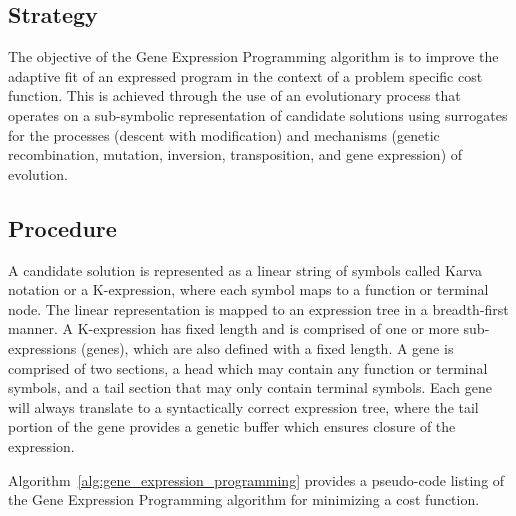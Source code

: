 \subsection{Strategy}
The objective of the Gene Expression Programming algorithm is to improve the adaptive fit of an expressed program in the context of a problem specific cost function.
This is achieved through the use of an evolutionary process that operates on a sub-symbolic representation of candidate solutions using surrogates for the processes (descent with modification) and mechanisms (genetic recombination, mutation, inversion, transposition, and gene expression) of evolution.

\subsection{Procedure}
A candidate solution is represented as a linear string of symbols called Karva notation or a K-expression, where each symbol maps to a function or terminal node. The linear representation is mapped to an expression tree in a breadth-first manner. 
A K-expression has fixed length and is comprised of one or more sub-expressions (genes), which are also defined with a fixed length. A gene is comprised of two sections, a head which may contain any function or terminal symbols, and a tail section that may only contain terminal symbols. Each gene will always translate to a syntactically correct expression tree, where the tail portion of the gene provides a genetic buffer which ensures closure of the expression.

Algorithm~\ref{alg:gene_expression_programming} provides a pseudo-code listing of the Gene Expression Programming algorithm for minimizing a cost function. 

